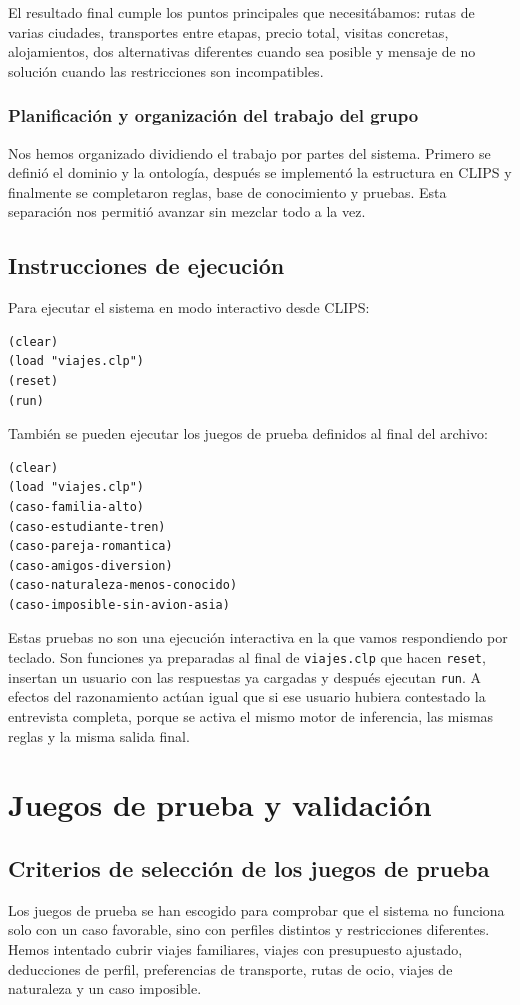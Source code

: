 \documentclass[11pt,a4paper]{article}
\begin{document}
El resultado final cumple los puntos principales que necesit\'abamos: rutas de
varias ciudades, transportes entre etapas, precio total, visitas concretas,
alojamientos, dos alternativas diferentes cuando sea posible y mensaje de no
soluci\'on cuando las restricciones son incompatibles.

\subsubsection{Planificaci\'on y organizaci\'on del trabajo del grupo}
Nos hemos organizado dividiendo el trabajo por partes del sistema. Primero se
defini\'o el dominio y la ontolog\'ia, despu\'es se implement\'o la estructura en
CLIPS y finalmente se completaron reglas, base de conocimiento y pruebas. Esta
separaci\'on nos permiti\'o avanzar sin mezclar todo a la vez.

\subsection{Instrucciones de ejecuci\'on}
Para ejecutar el sistema en modo interactivo desde CLIPS:
\begin{verbatim}
(clear)
(load "viajes.clp")
(reset)
(run)
\end{verbatim}

Tambi\'en se pueden ejecutar los juegos de prueba definidos al final del archivo:
\begin{verbatim}
(clear)
(load "viajes.clp")
(caso-familia-alto)
(caso-estudiante-tren)
(caso-pareja-romantica)
(caso-amigos-diversion)
(caso-naturaleza-menos-conocido)
(caso-imposible-sin-avion-asia)
\end{verbatim}

Estas pruebas no son una ejecuci\'on interactiva en la que vamos respondiendo
por teclado. Son funciones ya preparadas al final de \texttt{viajes.clp} que
hacen \texttt{reset}, insertan un usuario con las respuestas ya cargadas y
despu\'es ejecutan \texttt{run}. A efectos del razonamiento act\'uan igual que si
ese usuario hubiera contestado la entrevista completa, porque se activa el
mismo motor de inferencia, las mismas reglas y la misma salida final.

\section{Juegos de prueba y validaci\'on}
\subsection{Criterios de selecci\'on de los juegos de prueba}
Los juegos de prueba se han escogido para comprobar que el sistema no funciona
solo con un caso favorable, sino con perfiles distintos y restricciones
diferentes. Hemos intentado cubrir viajes familiares, viajes con presupuesto
ajustado, deducciones de perfil, preferencias de transporte, rutas de ocio,
viajes de naturaleza y un caso imposible.
\end{document}
